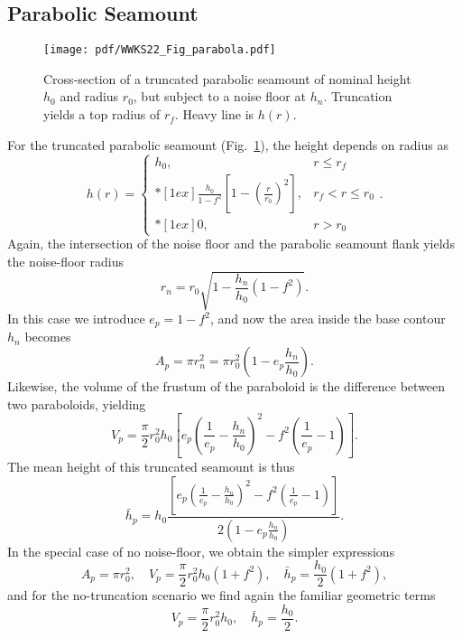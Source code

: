 \subsection{Parabolic Seamount}

\begin{figure}
\centering
\texttt{[image: pdf/WWKS22\_Fig\_parabola.pdf]}
\caption{Cross-section of a truncated parabolic seamount of nominal height $h_0$ and radius $r_0$, but
subject to a noise floor at $h_n$.  Truncation yields a top radius of $r_f$. Heavy line is $h(r)$.}
\label{WWKS22_Fig_parabola}
\end{figure}
For the truncated parabolic seamount (Fig.~\ref{WWKS22_Fig_parabola}), the height depends on radius as
\begin{equation*}
h(r) = \left \{ \begin{array}{cl}
	h_0, &	r \leq r_f \\*[1ex]
	\displaystyle \frac{h_0}{1-f^2} \left [1 - \left (\frac{r}{r_0} \right )^2 \right ], & r_f < r \leq r_0 \\*[1ex]
	0, & r > r_0
\end{array} \right..
\end{equation*}
Again, the intersection of the noise floor and the parabolic seamount flank yields the noise-floor
radius
\begin{equation*}
r_n = r_0 \sqrt{1 - \frac{h_n}{h_0}\left (1 - f^2 \right )}.
\end{equation*}
In this case we introduce $e_p = 1 - f^2$, and now the area inside the base contour $h_n$ becomes
\begin{equation}
A_p = \pi r_n^2 = \pi r_0^2 \left ( 1 - e_p \frac{h_n}{h_0} \right ).
\end{equation}
Likewise, the volume of the frustum of the paraboloid is the difference between two paraboloids, yielding
\begin{equation}
V_p = \frac{\pi}{2}r_0^2h_0 \left [ e_p \left (\frac{1}{e_p} - \frac{h_n}{h_0} \right )^2 - f^2 \left (\frac{1}{e_p} - 1 \right ) \right ].
\end{equation}
The mean height of this truncated seamount is thus
\begin{equation}
\bar{h}_p =  h_0 \frac{ \left [ e_p \left ( \frac{1}{e_p} - \frac{h_n}{h_0} \right )^2 -  f^2 \left (\frac{1}{e_p} - 1 \right ) \right ]}{2 \left ( 1 - e_p \frac{h_n}{h_0} \right )}.
\end{equation}
In the special case of no noise-floor, we obtain the simpler expressions
\begin{equation*}
A_p = \pi r_0^2,	\quad V_p = \frac{\pi}{2} r_0^2 h_0 \left (1 + f^2 \right ), \quad \bar{h}_p =  \frac{h_0}{2}\left (1 + f^2 \right ),
\end{equation*}
and for the no-truncation scenario we find again the familiar geometric terms
\begin{equation*}
V_p = \frac{\pi}{2}r_0^2h_0, \quad \bar{h}_p =  \frac{h_0}{2}.
\end{equation*}

